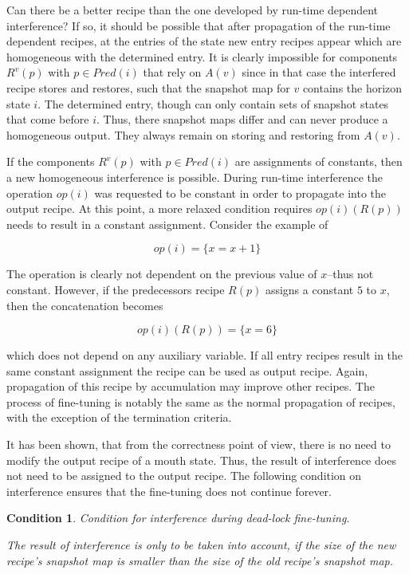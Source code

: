 \documentclass[12pt,a4paper]{scrartcl}
\newtheorem{condition}{Condition}
\begin{document}
Can there be a better recipe than the one developed by run-time dependent
interference? If so, it should be possible that after propagation of the
run-time dependent recipes, at the entries of the state new entry recipes
appear which are homogeneous with the determined entry. It is clearly
impossible for components $R^v(p)$ with $p \in Pred(i)$ that rely on
$A(v)$ since in that case the interfered recipe stores and restores, such that
the snapshot map for $v$ contains the horizon state $i$. The determined entry,
though can only contain sets of snapshot states that come before $i$. Thus,
there snapshot maps differ and can never produce a homogeneous output. They
always remain on storing and restoring from $A(v)$.

If the components $R^v(p)$ with $p \in Pred(i)$ are assignments of
constants, then a new homogeneous interference is possible. During run-time
interference the operation $op(i)$ was requested to be constant in order to
propagate into the output recipe. At this point, a more relaxed condition
requires $op(i)(R(p))$ needs to result in a constant assignment. Consider the
example of 

\begin{equation}
                       op(i) = \{ x = x + 1 \}
\end{equation}

The operation is clearly not dependent on the previous value of $x$--thus not
constant. However, if the predecessors recipe $R(p)$ assigns a constant $5$ to
$x$, then the concatenation becomes

\begin{equation}
                       op(i)(R(p)) = \{ x = 6 \}
\end{equation}

which does not depend on any auxiliary variable. If all entry recipes result in
the same constant assignment the recipe can be used as output recipe. Again,
propagation of this recipe by accumulation may improve other recipes. The process
of fine-tuning is notably the same as the normal propagation of recipes, with 
the exception of the termination criteria.

It has been shown, that from the correctness point of view, there is no need to
modify the output recipe of a mouth state. Thus, the result of interference
does not need to be assigned to the output recipe. The following condition 
on interference ensures that the fine-tuning does not continue forever.

\begin{condition}
Condition for interference during dead-lock fine-tuning.

The result of interference is only to be taken into account, if the size of the
new recipe's snapshot map is smaller than the size of the old recipe's snapshot
map.  
\end{condition}
\end{document}
